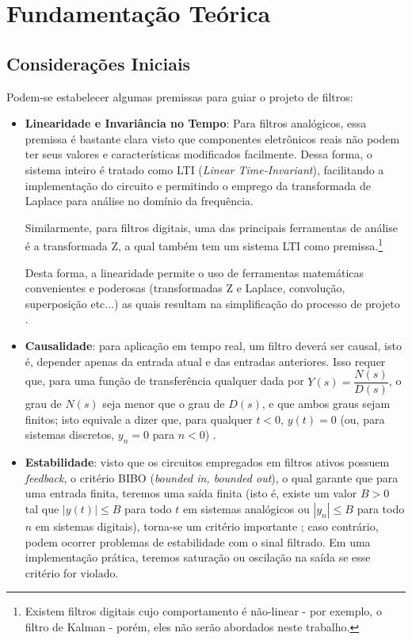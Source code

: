\chapter{Fundamentação Teórica}

\section{Considerações Iniciais}

Podem-se estabelecer algumas premissas para guiar o projeto de filtros:
\begin{itemize}
\item{\textbf{Linearidade e Invariância no Tempo}}: Para filtros analógicos, essa premissa é bastante clara visto que componentes eletrônicos reais não podem ter seus valores e características modificados facilmente. Dessa forma, o sistema inteiro é tratado como LTI (\textit{Linear Time-Invariant}), facilitando a implementação do circuito e permitindo o emprego da transformada de Laplace para análise no domínio da frequência. 

Similarmente, para filtros digitais, uma das principais ferramentas de análise é a transformada Z, a qual também tem um sistema LTI como premissa.\footnote{Existem filtros digitais cujo comportamento é não-linear - por exemplo, o filtro de Kalman - porém, eles não serão abordados neste trabalho.} 

Desta forma, a linearidade permite o uso de ferramentas matemáticas convenientes e poderosas (transformadas Z e Laplace, convolução, superposição etc...) as quais resultam na simplificação do processo de projeto \cite{oppenheim}.

\item{\textbf{Causalidade}:} para aplicação em tempo real, um filtro deverá ser causal, isto é, depender apenas da entrada atual e das entradas anteriores. Isso requer que, para uma função de transferência qualquer dada por $Y(s) = \dfrac{N(s)}{D(s)}$, o grau de $N(s)$ seja menor que o grau de $D(s)$, e que ambos graus sejam finitos; isto equivale a dizer que, para qualquer $t < 0$, $y(t) = 0$ (ou, para sistemas discretos, $y_n = 0$ para $n < 0$) \cite{oppenheim}.

\item{\textbf{Estabilidade}:} visto que os circuitos empregados em filtros ativos possuem \textit{feedback}, o critério BIBO (\textit{bounded in, bounded out}), o qual garante que para uma entrada finita, teremos uma saída finita (isto é, existe um valor $B > 0$ tal que $|y(t)| \leq B$ para todo $t$ em sistemas analógicos ou $|y_n| \leq B$ para todo $n$ em sistemas digitais), torna-se um critério importante \cite{oppenheim}; caso contrário, podem ocorrer problemas de estabilidade com o sinal filtrado. Em uma implementação prática, teremos saturação ou oscilação na saída se esse critério for violado. 


\end{itemize}

